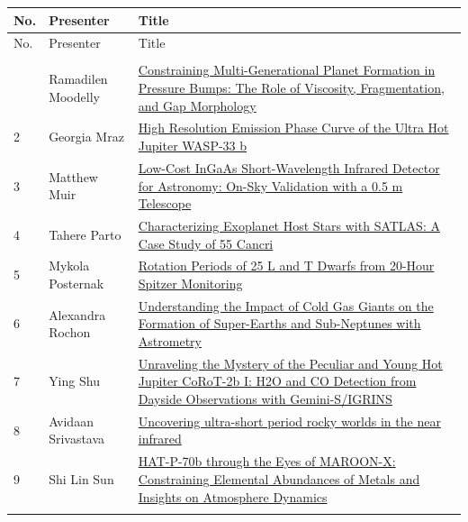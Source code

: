 {\small
{}
\sloppy
\setlength{\emergencystretch}{1em}
\begin{longtable}{@{}>{\TableRaggedRight\arraybackslash\hspace{0pt}}p{} >{\TableRaggedRight\arraybackslash\hspace{0pt}}p{} >{\TableRaggedRight\arraybackslash\hspace{0pt}}p{}@{}}
\toprule
No. & Presenter & Title \\
\midrule
\endfirsthead
\toprule
No. & Presenter & Title \\
\midrule
\endhead
\addlinespace[0.2em]
\multicolumn{3}{@{}l}{\sffamily\bfseries\color{cascateal} Exoplanets} \\
\addlinespace[0.15em]
1 & Ramadilen Moodelly & \hyperlink{poster-abstract-talk-80}{Constraining Multi-Generational Planet Formation in Pressure Bumps: The Role of Viscosity, Fragmentation, and Gap Morphology} \\
2 & Georgia Mraz & \hyperlink{poster-abstract-talk-221}{High Resolution Emission Phase Curve of the Ultra Hot Jupiter WASP-33 b} \\
3 & Matthew Muir & \hyperlink{poster-abstract-talk-332}{Low-Cost InGaAs Short-Wavelength Infrared Detector for Astronomy: On-Sky Validation with a 0.5 m Telescope} \\
4 & Tahere Parto & \hyperlink{poster-abstract-talk-306}{Characterizing Exoplanet Host Stars with SATLAS: A Case Study of 55 Cancri} \\
5 & Mykola Posternak & \hyperlink{poster-abstract-talk-88}{Rotation Periods of 25 L and T Dwarfs from 20-Hour Spitzer Monitoring} \\
6 & Alexandra Rochon & \hyperlink{poster-abstract-talk-253}{Understanding the Impact of Cold Gas Giants on the Formation of Super-Earths and Sub-Neptunes with Astrometry} \\
7 & Ying Shu & \hyperlink{poster-abstract-talk-91}{Unraveling the Mystery of the Peculiar and Young Hot Jupiter CoRoT-2b I: H2O and CO Detection from Dayside Observations with Gemini-S/IGRINS} \\
8 & Avidaan Srivastava & \hyperlink{poster-abstract-talk-46}{Uncovering ultra-short period rocky worlds in the near infrared} \\
9 & Shi Lin Sun & \hyperlink{poster-abstract-talk-298}{HAT-P-70b through the Eyes of MAROON-X: Constraining Elemental Abundances of Metals and Insights on Atmosphere Dynamics} \\
\addlinespace[0.2em]

\end{longtable}}
